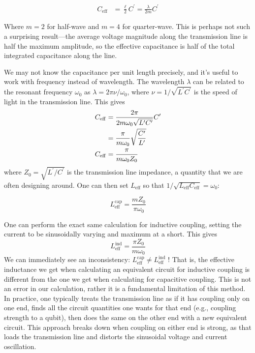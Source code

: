 \begin{align*}
	C_\mathrm{eff} &= \frac{\ell}{2} C^\prime = \frac{\lambda}{2m} C^\prime
\end{align*}

Where $m=2$ for half-wave and $m=4$ for quarter-wave. This is perhaps not such a surprising result---the average voltage magnitude along the transmission line is half the maximum amplitude, so the effective capacitance is half of the total integrated capacitance along the line.

We may not know the capacitance per unit length precisely, and it's useful to work with frequency instead of wavelength. The wavelength $\lambda$ can be related to the resonant frequency $\omega_0$ as $\lambda = 2 \pi \nu /\omega_0$, where $\nu = 1/\sqrt{L^\prime C^\prime}$ is the speed of light in the transmission line. This gives
\begin{align}
	C_\mathrm{eff} &= \frac{2\pi}{2 m \omega_0 \sqrt{L^\prime C^\prime}} C^\prime \notag \\
	&= \frac{\pi}{m \omega_0} \sqrt{\frac{C^\prime}{L^\prime}} \notag \\
	C_\mathrm{eff}&= \frac{\pi}{m \omega_0 Z_0}
\end{align}
where $Z_0 = \sqrt{L^\prime/C^\prime}$ is the transmission line impedance, a quantity that we are often designing around. One can then set $L_\mathrm{eff}$ so that $1/\sqrt{L_\mathrm{eff} C_\mathrm{eff}} = \omega_0$:

\begin{equation}
	L^\mathrm{cap}_\mathrm{eff} = \frac{m Z_0}{\pi \omega_0}
\end{equation}

One can perform the exact same calculation for inductive coupling, setting the current to be sinusoidally varying and maximum at a short. This gives
\begin{equation}
	L^\mathrm{ind}_\mathrm{eff} = \frac{\pi Z_0}{m\omega_0}
\end{equation}
We can immediately see an inconsistency: $L^\mathrm{cap}_\mathrm{eff} \neq L^\mathrm{ind}_\mathrm{eff}$ ! That is, the effective inductance we get when calculating an equivalent circuit for inductive coupling is different from the one we get when calculating for capacitive coupling. This is not an error in our calculation, rather it is a fundamental limitation of this method. In practice, one typically treats the transmission line as if it has coupling only on one end, finds all the circuit quantities one wants for that end (e.g., coupling strength to a qubit), then does the same on the other end with a new equivalent circuit. This approach breaks down when coupling on either end is strong, as that loads the transmission line and distorts the sinusoidal voltage and current oscillation.

